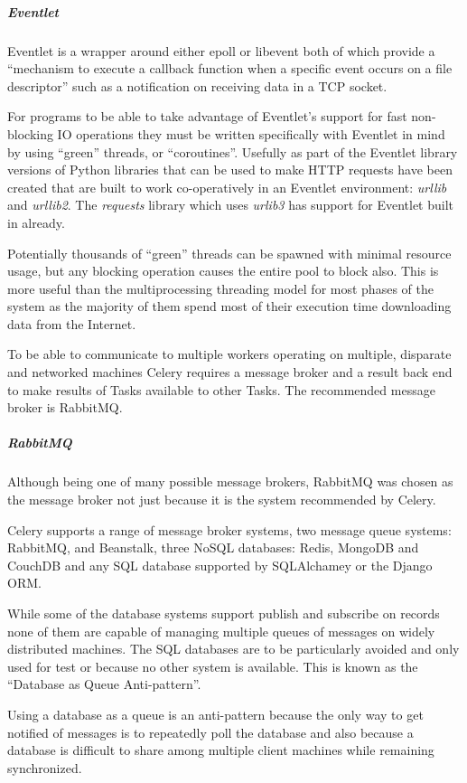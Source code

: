 \subparagraph{Eventlet}
Eventlet is a wrapper around either epoll or libevent both of which provide a ``mechanism to execute a callback function when a specific event occurs on a file descriptor'' such as a notification on receiving data in a TCP socket. 

For programs to be able to take advantage of Eventlet's support for fast non-blocking IO operations they must be written specifically with Eventlet in mind by using ``green'' threads, or ``coroutines''.  Usefully as part of the Eventlet library versions of Python libraries that can be used to make HTTP requests have been created that are built to work co-operatively in an Eventlet environment: \emph{urllib} and \emph{urllib2}. The \emph{requests} library which uses \emph{urlib3} has support for Eventlet built in already.

Potentially thousands of ``green'' threads can be spawned with minimal resource usage, but any blocking operation causes the entire pool to block also. This is more useful than the multiprocessing threading model for most phases of the system as the majority of them spend most of their execution time downloading data from the Internet.

To be able to communicate to multiple workers operating on multiple, disparate and networked machines Celery requires a message broker and a result back end to make results of Tasks available to other Tasks.  The recommended message broker is RabbitMQ.

\subparagraph{RabbitMQ}
Although being one of many possible message brokers, RabbitMQ was chosen as the message broker not just because it is the system recommended by Celery.

Celery supports a range of message broker systems, two message queue systems: RabbitMQ, and Beanstalk, three NoSQL databases: Redis, MongoDB and CouchDB and any SQL database supported by SQLAlchamey or the Django ORM.

While some of the database systems support publish and subscribe on records none of them are capable of managing multiple queues of messages on widely distributed machines.  The SQL databases are to be particularly avoided and only used for test or because no other system is available. This is known as the ``Database as Queue Anti-pattern''\cite{database-as-mq}.

Using a database as a queue is an anti-pattern because the only way to get notified of messages is to repeatedly poll the database and also because a database is difficult to share among multiple client machines while remaining synchronized.

